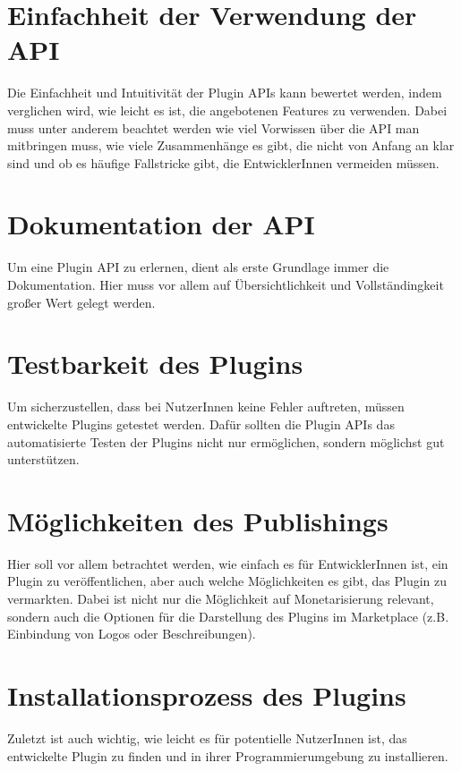 \section{Einfachheit der Verwendung der API} 
\label{sec:Kriterien_Intuitivität}    
Die Einfachheit und Intuitivität der Plugin APIs kann bewertet werden,
indem verglichen wird, wie leicht es ist, die
angebotenen Features zu verwenden.
Dabei muss unter anderem beachtet werden wie viel Vorwissen über die
API man mitbringen muss, wie viele Zusammenhänge es
gibt, die nicht von Anfang an klar sind und ob es 
häufige Fallstricke gibt, die EntwicklerInnen vermeiden müssen.

\section{Dokumentation der API} 
\label{sec:Kriterien_Dokumentation}    
Um eine Plugin API zu erlernen, dient als erste Grundlage
immer die Dokumentation. Hier muss vor allem
auf Übersichtlichkeit und Vollständingkeit großer Wert
gelegt werden.

\section{Testbarkeit des Plugins} 
\label{sec:Kriterien_Testbarkeit}
Um sicherzustellen, dass bei NutzerInnen keine Fehler auftreten,
müssen entwickelte Plugins getestet werden.
Dafür sollten die Plugin APIs das automatisierte
Testen der Plugins nicht nur ermöglichen, sondern möglichst
gut unterstützen.

\section{Möglichkeiten des Publishings} 
\label{sec:Kriterien_Publishing}    
Hier soll vor allem betrachtet werden, wie
einfach es für EntwicklerInnen ist, ein Plugin zu 
veröffentlichen, aber auch welche Möglichkeiten es gibt, 
das Plugin zu vermarkten. Dabei ist nicht nur die Möglichkeit
auf Monetarisierung relevant, sondern auch die
Optionen für die Darstellung des Plugins im Marketplace 
(z.B. Einbindung von Logos oder Beschreibungen).

\section{Installationsprozess des Plugins} 
\label{sec:Kriterien_Installationsprozess}    
Zuletzt ist auch wichtig, wie leicht es für potentielle 
NutzerInnen ist, das entwickelte Plugin zu finden und
in ihrer Programmierumgebung zu installieren.


